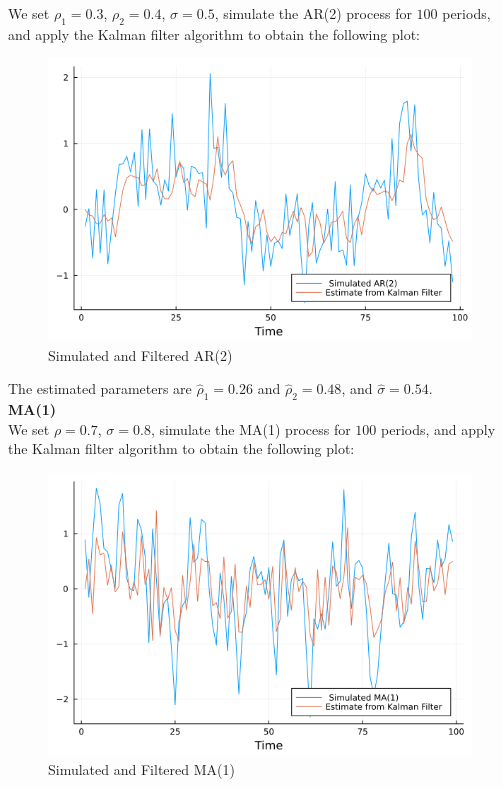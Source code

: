 \documentclass{article}
\begin{document}
	We set $\rho_{1} = 0.3$, $\rho_{2} = 0.4$, $\sigma = 0.5$, simulate the AR(2) process for $100$ periods, and apply the Kalman filter algorithm to obtain the following plot:
	
	\begin{figure}[htbp]
		\centering
		\includegraphics[scale=0.5]{AR2.png}
		\caption{Simulated and Filtered AR(2)}
	\end{figure} 
	
	The estimated parameters are $\hat{\rho}_{1} = 0.26$ and $\hat{\rho}_{2} = 0.48$, and $\hat{\sigma} = 0.54$. \\
	
	\noindent\textbf{\large MA(1)} \\
	
	We set $\rho = 0.7$, $\sigma = 0.8$, simulate the MA(1) process for $100$ periods, and apply the Kalman filter algorithm to obtain the following plot:
	
	\begin{figure}[htbp]
		\centering
		\includegraphics[scale=0.5]{MA1.png}
		\caption{Simulated and Filtered MA(1)}
	\end{figure} 
	
\end{document}
